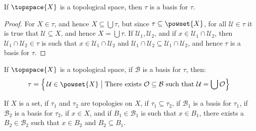\documentclass{article}                                                        %
\begin{document}
        \begin{theorem}
            If $\topspace{X}$ is a topological space, then $\tau$ is a basis
            for $\tau$.
        \end{theorem}
        \begin{proof}
            For $X\in\tau$, and hence $X\subseteq\bigcup\tau$, but since
            $\tau\subseteq\powset{X}$, for all $\mathcal{U}\in\tau$ it is true
            that $\mathcal{U}\subseteq{X}$, and hence $X=\bigcup\tau$. If
            $\mathcal{U}_{1},\mathcal{U}_{2}$, and if
            $x\in\mathcal{U}_{1}\cap\mathcal{U}_{2}$, then
            $\mathcal{U}_{1}\cap\mathcal{U}_{2}\in\tau$ is such that
            $x\in\mathcal{U}_{1}\cap\mathcal{U}_{2}$ and
            $\mathcal{U}_{1}\cap\mathcal{U}_{2}\subseteq%
             \mathcal{U}_{1}\cap\mathcal{U}_{2}$, and hence $\tau$ is a basis
            for $\tau$.
        \end{proof}
        \begin{theorem}
            If $\topspace{X}$ is a topological space, if $\mathcal{B}$ is a
            basis for $\tau$, then:
            \begin{equation}
                \tau=\Big\{\,\mathcal{U}\in\powset{X}\;\big|\;
                    \textrm{There exists }\mathcal{O}\subseteq\mathcal{B}
                    \textrm{ such that }\mathcal{U}=\bigcup\mathcal{O}\Big\}
            \end{equation}
        \end{theorem}
        \begin{theorem}
            If $X$ is a set, if $\tau_{1}$ and $\tau_{2}$ are topologies on $X$,
            if $\tau_{1}\subseteq\tau_{2}$, if $\mathcal{B}_{1}$ is a basis for
            $\tau_{1}$, if $\mathcal{B}_{2}$ is a basis for $\tau_{2}$, if
            $x\in{X}$, and if $B_{1}\in\mathcal{B}_{1}$ is such that
            $x\in{B}_{1}$, there exists a $B_{2}\in\mathcal{B}_{2}$ such that
            $x\in{B}_{2}$ and $B_{2}\subseteq{B}_{1}$.
        \end{theorem}
\end{document}
